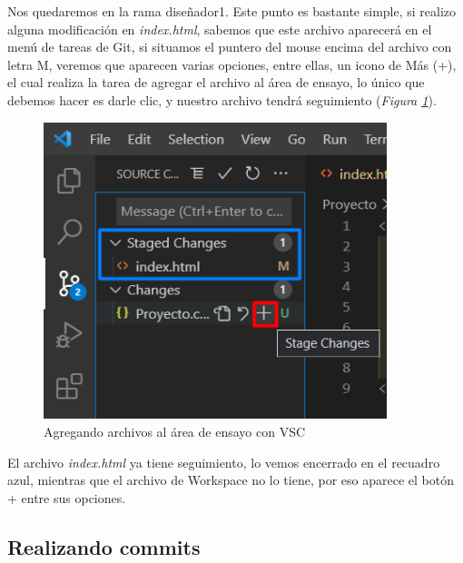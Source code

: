 Nos quedaremos en la rama diseñador1. Este punto es bastante simple, si realizo alguna modificación en \textit{index.html}, sabemos que este archivo aparecerá en el menú de tareas de Git, si situamos el puntero del mouse encima del archivo con letra M, veremos que aparecen varias opciones, entre ellas, un icono de Más (+), el cual realiza la tarea de agregar el archivo al área de ensayo, lo único que debemos hacer es darle clic, y nuestro archivo tendrá seguimiento (\textit{Figura \ref{fig: 20}}).
\begin{figure}[H]
    \centering
    \caption{Agregando archivos al área de ensayo con VSC}
    \label{fig: 20}
    \includegraphics[width=10cm]{capturas/seguimiento_archivos.png}
\end{figure}

El archivo \textit{index.html} ya tiene seguimiento, lo vemos encerrado en el recuadro azul, mientras que el archivo de Workspace no lo tiene, por eso aparece el botón + entre sus opciones.


\subsection{Realizando commits}

